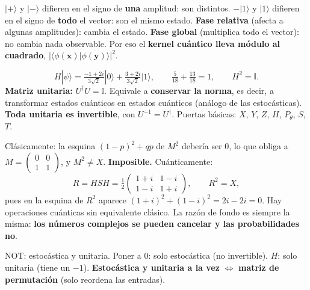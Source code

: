 \documentclass[11pt, a4paper, twoside, openright]{report}
\begin{document}
{$|+\rangle$ y $|-\rangle$ difieren en el signo de \textbf{una} amplitud: son distintos. \quad $-|1\rangle$ y $|1\rangle$ difieren en el signo de \textbf{todo} el vector: son el mismo estado.}
{\textbf{Fase relativa} (afecta a algunas amplitudes): cambia el estado. \textbf{Fase global} (multiplica todo el vector): no cambia nada observable. Por eso el \textbf{kernel cuántico lleva módulo al cuadrado}, $|\langle\phi(\mathbf{x})|\phi(\mathbf{y})\rangle|^2$.}

{\[ H|\psi\rangle = \tfrac{-1+2i}{3\sqrt2}|0\rangle + \tfrac{3+2i}{3\sqrt2}|1\rangle, \qquad \tfrac{5}{18} + \tfrac{13}{18} = 1, \qquad H^2 = \mathbb{I}. \]}
{\textbf{Matriz unitaria:} $U^\dagger U = \mathbb{I}$. Equivale a \textbf{conservar la norma}, es decir, a transformar estados cuánticos en estados cuánticos (análogo de las estocásticas). \textbf{Toda unitaria es invertible}, con $U^{-1} = U^\dagger$. Puertas básicas: $X$, $Y$, $Z$, $H$, $P_\theta$, $S$, $T$.}

{Clásicamente: la esquina $(1-p)^2 + qp$ de $M^2$ debería ser $0$, lo que obliga a $M = \begin{pmatrix}0&0\\1&1\end{pmatrix}$, y $M^2 \neq X$. \textbf{Imposible.}
Cuánticamente:
\[ R = HSH = \tfrac12\begin{pmatrix}1+i&1-i\\1-i&1+i\end{pmatrix}, \qquad R^2 = X, \]
pues en la esquina de $R^2$ aparece $(1+i)^2 + (1-i)^2 = 2i - 2i = 0$.}
{Hay operaciones cuánticas sin equivalente clásico. La razón de fondo es siempre la misma: \textbf{los números complejos se pueden cancelar y las probabilidades no}.}

{NOT: estocástica y unitaria. \quad Poner a $0$: solo estocástica (no invertible). \quad $H$: solo unitaria (tiene un $-1$).}
{\textbf{Estocástica y unitaria a la vez} $\iff$ \textbf{matriz de permutación} (solo reordena las entradas).}
\end{document}
